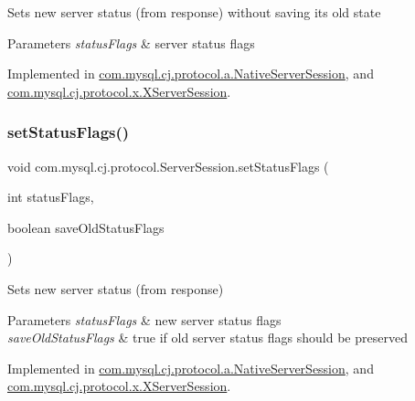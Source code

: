 Sets new server status (from response) without saving it\textquotesingle{}s old state


\begin{DoxyParams}{Parameters}
{\em status\+Flags} & server status flags \\
\hline
\end{DoxyParams}


Implemented in \mbox{\hyperlink{classcom_1_1mysql_1_1cj_1_1protocol_1_1a_1_1_native_server_session_ad533b5d433cde1b38176e2718308c7a4}{com.\+mysql.\+cj.\+protocol.\+a.\+Native\+Server\+Session}}, and \mbox{\hyperlink{classcom_1_1mysql_1_1cj_1_1protocol_1_1x_1_1_x_server_session_a30539eae0f7311ac3cd5c9f44c8f7585}{com.\+mysql.\+cj.\+protocol.\+x.\+X\+Server\+Session}}.

\mbox{\label{interfacecom_1_1mysql_1_1cj_1_1protocol_1_1_server_session_acf86f0ae9cdfd88f758ec42bb72bf127}} 
\subsubsection{\texorpdfstring{set\+Status\+Flags()}{setStatusFlags()}\hspace{0.1cm}{\footnotesize\ttfamily [2/2]}}
{\footnotesize\ttfamily void com.\+mysql.\+cj.\+protocol.\+Server\+Session.\+set\+Status\+Flags (\begin{DoxyParamCaption}\item[{int}]{status\+Flags,  }\item[{boolean}]{save\+Old\+Status\+Flags }\end{DoxyParamCaption})}

Sets new server status (from response)


\begin{DoxyParams}{Parameters}
{\em status\+Flags} & new server status flags \\
\hline
{\em save\+Old\+Status\+Flags} & true if old server status flags should be preserved \\
\hline
\end{DoxyParams}


Implemented in \mbox{\hyperlink{classcom_1_1mysql_1_1cj_1_1protocol_1_1a_1_1_native_server_session_a22280140ed155d3eedb9ab2c9c636afe}{com.\+mysql.\+cj.\+protocol.\+a.\+Native\+Server\+Session}}, and \mbox{\hyperlink{classcom_1_1mysql_1_1cj_1_1protocol_1_1x_1_1_x_server_session_a6b21c9c5c8446643ae85e58c3fe97af8}{com.\+mysql.\+cj.\+protocol.\+x.\+X\+Server\+Session}}.

